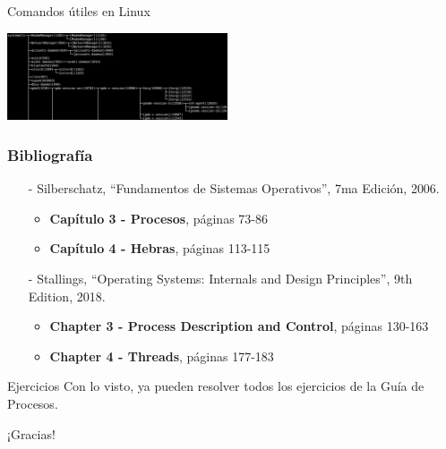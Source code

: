 \documentclass[aspectratio=169]{beamer}
\begin{document}
\begin{frame}[t,fragile]{Comandos útiles en Linux}
\begin{textblock}{90}
    \includegraphics[width=6.5cm]{img/pstree.png}
    \end{textblock}
\end{frame}

\begin{frame}[fragile]
    \frametitle{Bibliografía}
    \begin{itemize}
        \setlength\itemsep{0.5cm}
        \item[-] \small Silberschatz, ``Fundamentos de Sistemas Operativos'', 7ma Edición, 2006.\\
        \begin{itemize}
            \item \textbf{Capítulo 3 - Procesos}, páginas 73-86
            \item \textbf{Capítulo 4 - Hebras}, páginas 113-115
        \end{itemize}
        \item[-] \small Stallings, ``Operating Systems: Internals and Design Principles'', 9th Edition, 2018.\\
        \begin{itemize}
            \item \textbf{Chapter 3 - Process Description and Control}, páginas 130-163
            \item \textbf{Chapter 4 - Threads}, páginas 177-183
        \end{itemize}
    \end{itemize}
\end{frame}

\begin{frame}[fragile]{Ejercicios}
    Con lo visto, ya pueden resolver todos los ejercicios de la Guía de Procesos.
\end{frame}

\begin{frame}[plain]
    \begin{center}
    \vspace{2cm}
    \huge ¡Gracias!\\
    \vspace{2cm}
    \end{center}
\end{frame}
\end{document}
